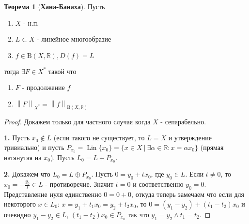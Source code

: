 \documentclass[12pt,a4paper]{article}
\theoremstyle{definition}
\newtheorem{theorem}{Теорема}
\newcommand{\Real}{\mathbb{R}}
\newcommand{\norm}[1]{\left\lVert#1\right\rVert}
\newcommand{\setbuild}[2]{\{#1\:|\:#2\}}
\DeclareMathOperator{\Lin}{Lin}
\newcommand{\bounded}[2]{\textrm{B}(#1, #2)}
\begin{document}
\begin{theorem}[\textbf{Хана-Банаха}]\label{th:1}
	Пусть 
	\begin{enumerate}
		\item $X$ - н.п.
		\item $L\subset X$ - линейное многообразие
		\item $f\in \bounded{X}{\Real}, D(f) = L$
	\end{enumerate}
	тогда $\exists F\in X^*$ такой что
	\begin{enumerate}
		\item $F$ - продолжение $f$
		\item $\norm{F}_{X^*} = \norm{f}_{\bounded{X}{\Real}}$
	\end{enumerate}
\end{theorem}
\begin{proof}
	Докажем только для частного случая когда $X$ - сепарабельно. \newline \newline
	
	\textbf{1.} Пусть $x_0 \notin L$ (если такого не существует, то $L=X$ и утверждение тривиально) и пусть $P_{x_0} = \Lin{\{x_0\}} = 
	\setbuild{x\in X}{\exists\alpha\in\Real: x=\alpha x_0}$ (прямая натянутая на $x_0$). Пусть $L_0 = L + P_{x_0}$. \newline
	\newline
	
	\textbf{2.} Докажем что $L_0 = L\oplus P_{x_0}$. \newline
	Пусть $0=y_0 + tx_0$, где $y_0\in L$. Если $t\neq0$, то $x_0 = -\frac{y_0}{t} \in L$ - противоречие. Значит $t=0$ и соответственно $y_0 = 0$. Представление нуля единственно $0 = 0 + 0$, откуда теперь замечаем что если для некоторого $x\in L_0$: $x = y_1 + t_1 x_0 = y_2 + t_2 x_0$, то $0 = (y_1 - y_2) + (t_1 - t_2) x_0$ и очевидно $y_1 - y_2 \in L$, $(t_1 - t_2)x_0 \in P_{x_0}$ так что $y_1 = y_2 \wedge t_1 = t_2$. \newline
	\newpage
	

\end{proof}
\end{document}
